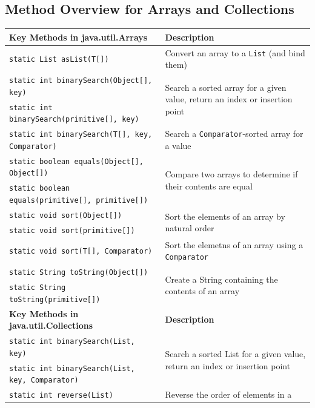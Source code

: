 \subsection{Method Overview for Arrays and Collections}
\begin{center}
\begin{tabular}{lp{}}
    \textbf{Key Methods in java.util.Arrays} & \textbf{Description} \\
    \hline
    \verb#static List asList(T[])# & Convert an array to a \verb#List# (and 
    bind them) \\
    \hline
    \verb#static int binarySearch(Object[], key)# & 
    \multirow{2}{0.4\textwidth}{Search a sorted array for a given value, return 
    an index or insertion point} \\
    \verb#static int binarySearch(primitive[], key)# & \\
    \hline
    \verb#static int binarySearch(T[], key, Comparator)# & Search a 
    \verb#Comparator#-sorted array for a value \\
    \hline
    \verb#static boolean equals(Object[], Object[])# & 
    \multirow{2}{0.4\textwidth}{Compare two arrays to determine if their 
    contents are equal} \\
    \verb#static boolean equals(primitive[], primitive[])# & \\
    \hline
    \verb#static void sort(Object[])# & \multirow{2}{0.4\textwidth}{Sort the 
    elements of an array by natural order} \\
    \verb#static void sort(primitive[])# & \\
    \hline
    \verb#static void sort(T[], Comparator)# & Sort the elemetns of an array 
    using a \verb#Comparator# \\
    \hline
    \verb#static String toString(Object[])# & 
    \multirow{2}{0.4\textwidth}{Create a String containing the contents of an 
    array} \\
    \verb#static String toString(primitive[])# & \\
    \hline
    \textbf{Key Methods in java.util.Collections} & \textbf{Description} \\
    \hline
    \verb#static int binarySearch(List, key)# & 
    \multirow{2}{0.4\textwidth}{Search a sorted List for a given value, return 
    an index or insertion point} \\
    \verb#static int binarySearch(List, key, Comparator)# & \\
    \hline
    \verb#static int reverse(List)# & Reverse the order of elements in a 

\end{tabular}
\end{center}

